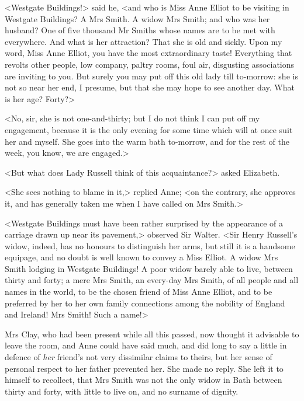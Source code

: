 <Westgate Buildings!> said he, <and who is Miss Anne Elliot to be visiting in Westgate Buildings? A Mrs Smith. A widow Mrs Smith; and who was her husband? One of five thousand Mr Smiths whose names are to be met with everywhere. And what is her attraction? That she is old and sickly. Upon my word, Miss Anne Elliot, you have the most extraordinary taste! Everything that revolts other people, low company, paltry rooms, foul air, disgusting associations are inviting to you. But surely you may put off this old lady till to-morrow: she is not so near her end, I presume, but that she may hope to see another day. What is her age? Forty?>

<No, sir, she is not one-and-thirty; but I do not think I can put off my engagement, because it is the only evening for some time which will at once suit her and myself. She goes into the warm bath to-morrow, and for the rest of the week, you know, we are engaged.>

<But what does Lady Russell think of this acquaintance?> asked Elizabeth.

<She sees nothing to blame in it,> replied Anne; <on the contrary, she approves it, and has generally taken me when I have called on Mrs Smith.>

<Westgate Buildings must have been rather surprised by the appearance of a carriage drawn up near its pavement,> observed Sir Walter. <Sir Henry Russell's widow, indeed, has no honours to distinguish her arms, but still it is a handsome equipage, and no doubt is well known to convey a Miss Elliot. A widow Mrs Smith lodging in Westgate Buildings! A poor widow barely able to live, between thirty and forty; a mere Mrs Smith, an every-day Mrs Smith, of all people and all names in the world, to be the chosen friend of Miss Anne Elliot, and to be preferred by her to her own family connections among the nobility of England and Ireland! Mrs Smith! Such a name!>

Mrs Clay, who had been present while all this passed, now thought it advisable to leave the room, and Anne could have said much, and did long to say a little in defence of \textit{her} friend's not very dissimilar claims to theirs, but her sense of personal respect to her father prevented her. She made no reply. She left it to himself to recollect, that Mrs Smith was not the only widow in Bath between thirty and forty, with little to live on, and no surname of dignity.

